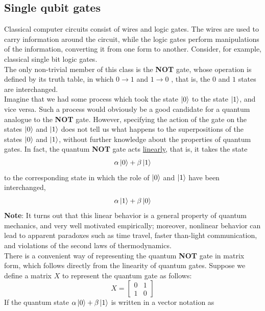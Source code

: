 \documentclass{article}
\begin{document}
\subsection{Single qubit gates}
\label{Single qubit gates}
Classical computer circuits consist of wires and logic gates. The wires are used to carry
information around the circuit, while the logic gates perform manipulations of the information, converting it from one form to another. Consider, for example, classical single bit
logic gates.\\
The only non-trivial member of this class is the \textbf{NOT} gate, whose operation is defined by its truth table, in which  $0 \rightarrow 1$  and  $1 \rightarrow 0$ , that is, the $0$ and $1$ states are interchanged.\\
Imagine that we had some process which took the state $\ket{0}$ to the state $\ket{1}$, and vice versa. Such a process would obviously be a good candidate for a quantum analogue to the \textbf{NOT} gate. However, specifying the action of the gate on the states $\ket{0}$ and $\ket{1}$ does not tell us what happens to the superpositions of the states $\ket{0}$ and $\ket{1}$, without further knowledge about the properties of quantum gates. In fact, the quantum \textbf{NOT} gate acts \underline{linearly}, that is, it takes the state 
\begin{equation}
    \alpha\ket{0}+\beta\ket{1}
\end{equation}
to the corresponding state in which the role of 
$\ket{0}$ and $\ket{1}$ have been interchanged,
\begin{equation}
    \alpha\ket{1}+\beta\ket{0}
\end{equation}
\textbf{Note}: It turns out that this linear
behavior is a general property of quantum mechanics, and very well motivated empirically;
moreover, nonlinear behavior can lead to apparent paradoxes such as time travel, faster than-light communication, and violations of the second laws of thermodynamics.\\
There is a convenient way of representing the quantum \textbf{NOT} gate in matrix form,
which follows directly from the linearity of quantum gates. Suppose we define a matrix
$X$ to represent the quantum gate as follows:
\begin{equation}
    X = \begin{bmatrix}
        0 & 1 \\ 1 & 0 
    \end{bmatrix}
\end{equation}
If the quantum state $\alpha\ket{0}+\beta\ket{1}$ is written in a vector notation as
\end{document}
